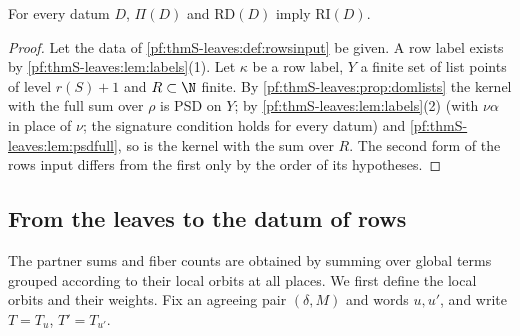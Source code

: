 \begin{theorem}\label{pf:thmS-leaves:thm:rowsinput}
For every datum $D$, $\Pi(D)$ and $\mathrm{RD}(D)$ imply $\mathrm{RI}(D)$.
\end{theorem}

\begin{proof}
Let the data of \cref{pf:thmS-leaves:def:rowsinput} be given. A row label exists by \cref{pf:thmS-leaves:lem:labels}(1). Let
$\kappa$ be a row label, $Y$ a finite set of list points of level $r(S)+1$ and $R\subset\N$ finite. By
\cref{pf:thmS-leaves:prop:domlists} the kernel with the full sum over $\rho$ is PSD on $Y$; by
\cref{pf:thmS-leaves:lem:labels}(2) (with $\nu\alpha$ in place of $\nu$; the signature condition holds for every datum) and
\cref{pf:thmS-leaves:lem:psdfull}, so is the kernel with the sum over $R$. The second form of the rows input differs from the
first only by the order of its hypotheses.
\end{proof}

\subsection{From the leaves to the datum of rows}\label{pf:thmS-leaves:ss:leavesrows}

The partner sums and fiber counts are obtained by summing over global terms grouped according to their local orbits
at all places. We first define the local orbits and their weights. Fix an agreeing pair $(\delta,M)$ and words $u,u'$,
and write $T=T_u$, $T'=T_{u'}$.

